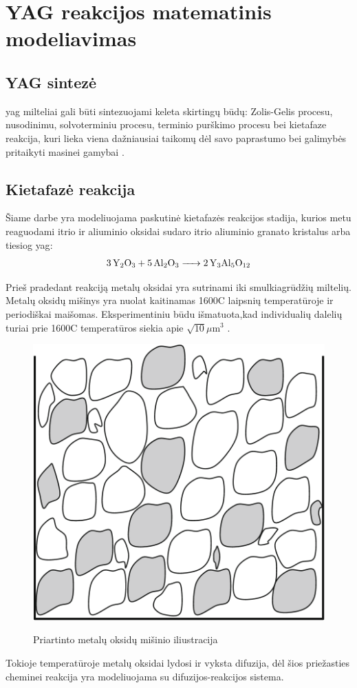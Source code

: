 
\section{YAG reakcijos matematinis modeliavimas}

\subsection{YAG sintezė}

\acs{yag} milteliai gali būti sintezuojami keleta skirtingų būdų: Zolis-Gelis procesu, nusodinimu, solvoterminiu procesu, terminio purškimo procesu bei kietafaze reakcija, kuri lieka viena dažniausiai taikomų dėl savo paprastumo bei galimybės pritaikyti masinei gamybai \cite{zhangNovelSynthesisYAG2005}.

\subsection{Kietafazė reakcija}

Šiame darbe yra modeliuojama paskutinė kietafazės reakcijos stadija, kurios metu reaguodami itrio ir aliuminio oksidai sudaro itrio aliuminio granato kristalus arba tiesiog \acs{yag}:
\begin{align*}
  \ce{3Y_2O_3 + 5Al_2O_3 -> 2Y_3Al_5O_12}
\end{align*}

Prieš pradedant reakciją metalų oksidai yra sutrinami iki smulkiagrūdžių miltelių. Metalų oksidų mišinys yra nuolat kaitinamas 1600\degree C laipsnių temperatūroje ir periodiškai maišomas. Eksperimentiniu būdu išmatuota,kad individualių dalelių turiai prie 1600\degree C temperatūros siekia apie $\sqrt{10}\mu\text{m}^3$ \cite{ivanauskasComputationalModellingYAG2009}.

\begin{figure}[h]
  \centering
  \caption{Priartinto metalų oksidų mišinio iliustracija}
  \includegraphics[width=0.25\linewidth]{assets/metal_oxides_mixture.png}
  \label{fig:metal-oxides-mixuter}
\end{figure}

Tokioje temperatūroje metalų oksidai lydosi ir vyksta difuzija, dėl šios priežasties cheminei reakcija yra modeliuojama su difuzijos-reakcijos sistema.
